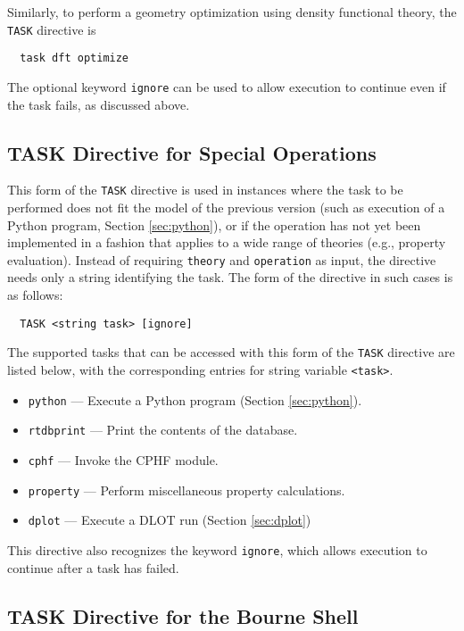 Similarly, to perform a geometry optimization using density functional
theory, the \verb+TASK+ directive is
\begin{verbatim}
  task dft optimize
\end{verbatim}

The optional keyword \verb+ignore+ can be used to allow execution to
continue even if the task fails, as discussed above.

\subsection{TASK Directive for Special Operations}

This form of the \verb+TASK+ directive is used in instances where the
task to be performed does not fit the model of the previous version
(such as execution of a Python program, Section \ref{sec:python}), or
if the operation has not yet been implemented in a fashion that
applies to a wide range of theories (e.g., property evaluation).
Instead of requiring \verb+theory+ and \verb+operation+ as input, the
directive needs only a string identifying the task.  The form of the
directive in such cases is as follows:

\begin{verbatim}
  TASK <string task> [ignore]
\end{verbatim}

The supported tasks that can be accessed with this form of the \verb+TASK+
directive are listed
below, with the corresponding entries for string variable \verb+<task>+.

\begin{itemize}
  \item \verb+python+ --- Execute a Python program (Section \ref{sec:python}).
  \item \verb+rtdbprint+ --- Print the contents of the database.
  \item \verb+cphf+ --- Invoke the CPHF module.
  \item \verb+property+ --- Perform miscellaneous property calculations.
  \item \verb+dplot+ --- Execute a DLOT run (Section \ref{sec:dplot})
\end{itemize}

This directive also recognizes the keyword \verb+ignore+, which allows
execution to continue after a task has failed.

\subsection{TASK Directive for the Bourne Shell}

